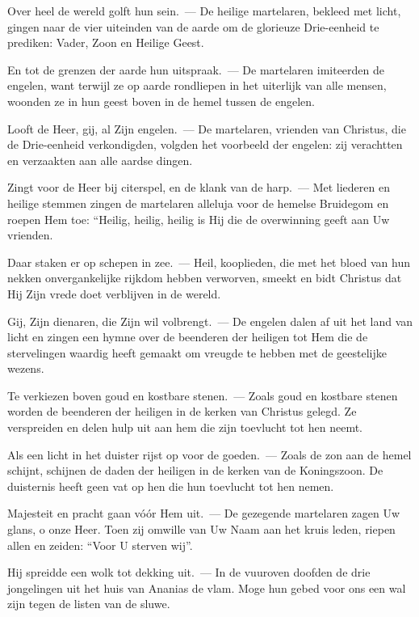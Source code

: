 \documentclass[12pt,twoside,a5paper]{article}
\begin{document}
\begin{halfparskip}

  Over heel de wereld golft hun sein.~--- De heilige martelaren, bekleed met licht, gingen naar de vier uiteinden van de aarde om de glorieuze Drie-eenheid te prediken: Vader, Zoon en Heilige Geest.

  En tot de grenzen der aarde hun uitspraak.~--- De martelaren imiteerden de engelen, want terwijl ze op aarde rondliepen in het uiterlijk van alle mensen, woonden ze in hun geest boven in de hemel tussen de engelen.

  Looft de Heer, gij, al Zijn engelen.~--- De martelaren, vrienden van Christus, die de Drie-eenheid verkondigden, volgden het voorbeeld der engelen: zij verachtten en verzaakten aan alle aardse dingen.

  Zingt voor de Heer bij citerspel, en de klank van de harp.~--- Met liederen en heilige stemmen zingen de martelaren alleluja voor de hemelse Bruidegom en roepen Hem toe: ``Heilig, heilig, heilig is Hij die de overwinning geeft aan Uw vrienden.

  Daar staken er op schepen in zee.~--- Heil, kooplieden, die met het bloed van hun nekken onvergankelijke rijkdom hebben verworven, smeekt en bidt Christus dat Hij Zijn vrede doet verblijven in de wereld.

  Gij, Zijn dienaren, die Zijn wil volbrengt.~--- De engelen dalen af uit het land van licht en zingen een hymne over de beenderen der heiligen tot Hem die de stervelingen waardig heeft gemaakt om vreugde te hebben met de geestelijke wezens.

  Te verkiezen boven goud en kostbare stenen.~--- Zoals goud en kostbare stenen worden de beenderen der heiligen in de kerken van Christus gelegd. Ze verspreiden en delen hulp uit aan hem die zijn toevlucht tot hen neemt.

  Als een licht in het duister rijst op voor de goeden.~--- Zoals de zon aan de hemel schijnt, schijnen de daden der heiligen in de kerken van de Koningszoon. De duisternis heeft geen vat op hen die hun toevlucht tot hen nemen.

  Majesteit en pracht gaan vóór Hem uit.~--- De gezegende martelaren zagen Uw glans, o onze Heer. Toen zij omwille van Uw Naam aan het kruis leden, riepen allen en zeiden: ``Voor U sterven wij''.

  Hij spreidde een wolk tot dekking uit.~--- In de vuuroven doofden de drie jongelingen uit het huis van Ananias de vlam. Moge hun gebed voor ons een wal zijn tegen de listen van de sluwe.


\end{halfparskip}
\end{document}

